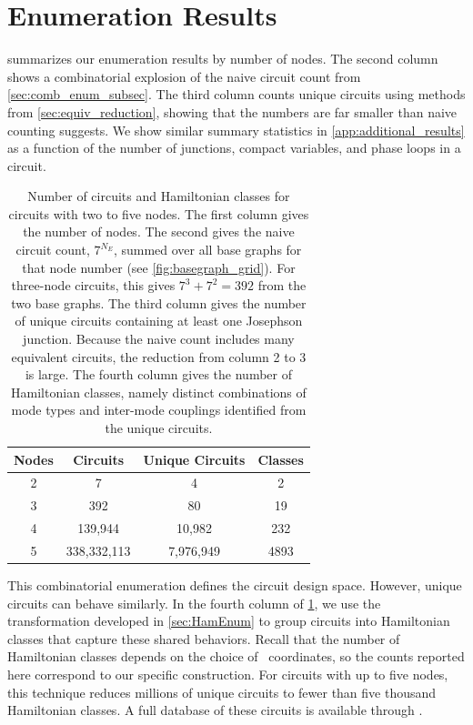  
\section{Enumeration Results}\label{sec:results}

 summarizes our enumeration results by number of nodes. The second column shows a combinatorial explosion of the naive circuit count from \cref{sec:comb_enum_subsec}. The third column counts unique circuits using methods from \cref{sec:equiv_reduction}, showing that the numbers are far smaller than naive counting suggests. We show similar summary statistics in \cref{app:additional_results} as a function of the number of junctions, compact variables, and phase loops in a circuit.

\begin{table}[htbp]
\setlength{\tabcolsep}{13pt}
\begin{tabular}{@{}cccc@{}}
\toprule
Nodes      &  Circuits&  Unique Circuits  &  Classes \\ \toprule
2                  & 7          &   4                  & 2  \\ \midrule
3                  & 392        &   80                 &  19 \\ \midrule
4                  & 139,944    &   10,982             &  232 \\\midrule
5             & 338,332,113  &  7,976,949          &  4893 \\\bottomrule
\end{tabular}
    \caption{
    Number of circuits and Hamiltonian classes for circuits with two to five nodes. The first column gives the number of nodes. The second gives the naive circuit count, $7^{N_E}$, summed over all base graphs for that node number (see \cref{fig:basegraph_grid}). For three-node circuits, this gives $7^3 + 7^2 = 392$ from the two base graphs. The third column gives the number of unique circuits containing at least one Josephson junction. Because the naive count includes many equivalent circuits, the reduction from column 2 to 3 is large. The fourth column gives the number of Hamiltonian classes, namely distinct combinations of mode types and inter-mode couplings identified from the unique circuits.}\label{tab:overview}
\end{table}

This combinatorial enumeration defines the circuit design space. However, unique circuits can behave similarly. In the fourth column of \cref{tab:overview}, we use the transformation developed in \cref{sec:HamEnum} to group circuits into Hamiltonian classes that capture these shared behaviors. Recall that the number of Hamiltonian classes depends on the choice of \canonical\ coordinates, so the counts reported here correspond to our specific construction.
For circuits with up to five nodes, this technique reduces millions of unique circuits to fewer than five thousand Hamiltonian classes. A full database of these circuits is available through \cite{weissler_2026_zenodo_data}.



